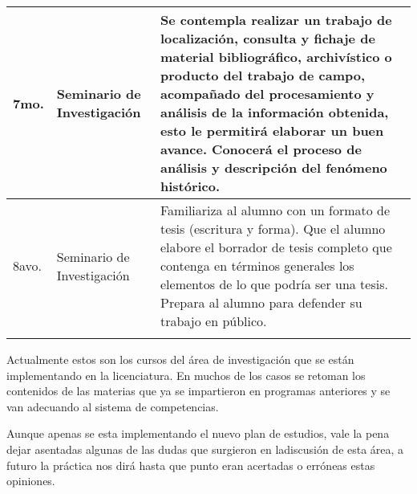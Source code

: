 \begin{scriptsize}
\begin{flushleft}
\begin{supertabular}{|m{0.062\textwidth}|m{0.32\textwidth}|m{0.56\textwidth}|}
7mo. &
Seminario de Investigación &
Se contempla realizar un
trabajo de localización, consulta y fichaje de material bibliográfico,
archivístico o producto del trabajo de campo, acompañado del procesamiento
y análisis de la información obtenida, esto le permitirá elaborar un buen
avance. Conocerá el proceso de análisis y descripción del fenómeno
histórico.\\\hline
8avo. &
Seminario de Investigación &
Familiariza al alumno con un formato de tesis (escritura y forma). Que el
alumno elabore  el borrador de tesis completo que contenga en términos
generales los elementos de lo que podría ser una tesis. Prepara al alumno
para defender su trabajo en público.\\\hline\hline
{}\\%
\end{supertabular}
\end{flushleft}
\end{scriptsize}

\bigskip
Actualmente estos son los cursos del área de investigación que se están 
implementando en la licenciatura. En muchos de los casos se retoman los 
contenidos de las materias que ya se impartieron en programas 
anteriores y se van adecuando al sistema de competencias.

\enlargethispage{1\baselineskip}
Aunque apenas se esta implementando el nuevo plan de estudios, vale la 
pena dejar asentadas algunas de las dudas que surgieron en la\linebreak discusión 
de esta área, a futuro la práctica nos dirá hasta que punto eran 
acertadas o erróneas estas opiniones. 

